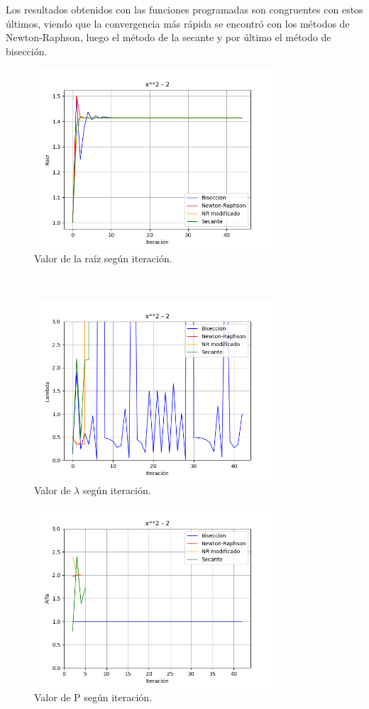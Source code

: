 \documentclass[titlepage,a4paper]{article}
\begin{document}
Los resultados obtenidos con las funciones programadas son congruentes con estos últimos, viendo que la convergencia más rápida se encontró con los métodos de Newton-Raphson, luego el método de la secante y por último el método de bisección.

\begin{figure}[H]
\centering
\includegraphics[width=0.8\textwidth]{raiz f1.png}
\caption{\label{fig:class01}Valor de la raíz según iteración.}
\end{figure}
\\
\begin{figure}[H]
\centering
\includegraphics[width=0.8\textwidth]{lambda f1.png}
\caption{\label{fig:class01}Valor de $\lambda$ según iteración.}
\end{figure}
\begin{figure}[H]
\centering
\includegraphics[width=0.8\textwidth]{alfa f1.png}
\caption{\label{fig:class01}Valor de P según iteración.}
\end{figure}
\end{document}
